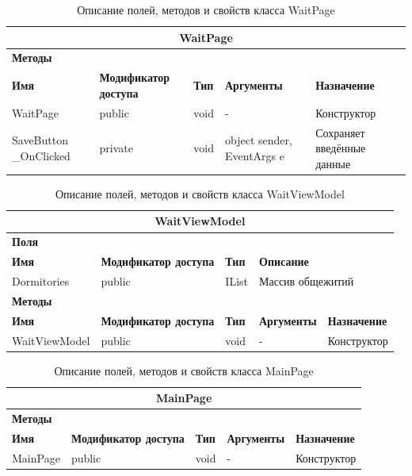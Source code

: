 \documentclass{../includes/TechDoc}
\begin{document}
    \begin{table}[ht]
        \caption{\label{tab:class-waitpage-table}Описание полей, методов и свойств класса WaitPage}
        \centering
        \begin{tabular}{|p{3.2cm}|p{3cm}|p{2.9cm}|p{2.9cm}|p{4cm}|}
            \hline
            \multicolumn{5}{|c|}{WaitPage} \\ \hline
            \multicolumn{5}{|l|}{\textbf{Методы}} \\ \hline
            \textbf{Имя} & \textbf{Модификатор доступа} & \textbf{Тип} & \textbf{Аргументы} & \textbf{Назначение} \\ \hline
            WaitPage & public & void & - & Конструктор \\ \hline
            SaveButton \_OnClicked & private & void & object sender, EventArgs e & Сохраняет введённые данные \\ \hline
        \end{tabular}
    \end{table}

    \begin{table}[ht]
        \caption{\label{tab:class-waitviewmodel-table}Описание полей, методов и свойств класса WaitViewModel}
        \centering
        \begin{tabular}{|p{3.2cm}|p{3cm}|p{2.9cm}|p{2.9cm}|p{4cm}|}
            \hline
            \multicolumn{5}{|c|}{WaitViewModel} \\ \hline
            \multicolumn{5}{|l|}{\textbf{Поля}} \\ \hline
            \textbf{Имя} & \textbf{Модификатор доступа} & \textbf{Тип} & \multicolumn{2}{p{6.9cm}|}{\textbf{Описание}} \\ \hline
            Dormitories & public & IList & \multicolumn{2}{p{6.9cm}|}{Массив общежитий} \\ \hline
            \multicolumn{5}{|l|}{\textbf{Методы}} \\ \hline
            \textbf{Имя} & \textbf{Модификатор доступа} & \textbf{Тип} & \textbf{Аргументы} & \textbf{Назначение} \\ \hline
            WaitViewModel & public & void & - & Конструктор \\ \hline
        \end{tabular}
    \end{table}

    \begin{table}[ht]
        \caption{\label{tab:class-mainpage-table}Описание полей, методов и свойств класса MainPage}
        \centering
        \begin{tabular}{|p{3.2cm}|p{3cm}|p{2.9cm}|p{2.9cm}|p{4cm}|}
            \hline
            \multicolumn{5}{|c|}{MainPage} \\ \hline
            \multicolumn{5}{|l|}{\textbf{Методы}} \\ \hline
            \textbf{Имя} & \textbf{Модификатор доступа} & \textbf{Тип} & \textbf{Аргументы} & \textbf{Назначение} \\ \hline
            MainPage & public & void & - & Конструктор \\ \hline
        \end{tabular}
    \end{table}
\end{document}
